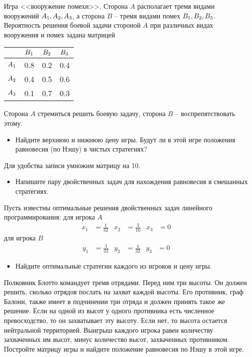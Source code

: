\begin{exercise}
Игра <<вооружение помехи>>. Сторона $A$ располагает тремя видами вооружений
$A_1,A_2,A_3$, а сторона $B$ -- тремя видами помех 
$B_1,B_2,B_3$. Вероятность решения
боевой задачи стороной $A$ при различных видах вооружения и помех задана матрицей
\begin{center}
	\begin{tabular}{|c|c|c|c|}\hline
	& $B_1$ & $B_2$ & $B_3$ \\ \hline
	$A_1$ & 0.8 & 0.2 & 0.4 \\ \hline
	$A_2$ & 0.4 & 0.5 & 0.6 \\ \hline
	$A_3$ & 0.1 & 0.7 & 0.3 \\ \hline
	\end{tabular}
\end{center}
Сторона $A$ стремиться решить боевую задачу, сторона $B$ -- воспрепятствовать этому.
\begin{itemize}
	\item Найдите верхнюю и нижнюю цену игры. Будут ли в этой игре положения равновесия
	(по Нэшу) в чистых стратегиях?
\end{itemize}
Для удобства записи умножим матрицу на 10.
\begin{itemize}
	\item Напишите пару двойственных задач для нахождения равновесия в смешанных стратегиях.
\end{itemize}
Пусть известны оптимальные решения двойственных задач линейного программирования:
для игрока $A$
\begin{align*}
	x_1&=\frac{1}{32} & x_2&=\frac{3}{16} & x_3&=0
\end{align*}
для игрока $B$
\begin{align*}
	y_1&=\frac{3}{32} & y_2&=\frac{4}{32} & y_3&=0
\end{align*}
\begin{itemize}
	\item Найдите оптимальные стратегии каждого из игроков и цену игры.
\end{itemize}
\end{exercise}

\begin{exercise}
Полковник Блотто командует тремя отрядами. Перед ним три высоты.
Он должен решить, сколько отрядов послать на захват каждой высоты.
Его противник, граф Балони, также имеет в подчинении три отряда и должен принять такое же решение. 
Если на одной из высот у одного противника есть численное превосходство, то он захватывает эту высоту. 
Если нет, то высота остается нейтральной территорией. 
Выигрыш каждого игрока равен количеству захваченных им высот, 
минус количество высот, захваченных противником. 
Постройте матрицу игры и найдите положение равновесия по Нэшу в этой игре.
\end{exercise}


